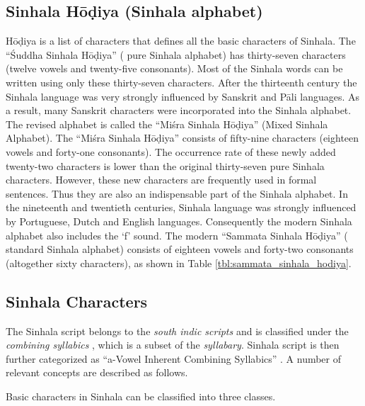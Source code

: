 \documentclass[english]{jnlp_1.3e}
\begin{document}
\subsection{Sinhala H\={o}\d{d}iya (Sinhala alphabet)}

\label{sinhala_alphabet}

H\={o}\d{d}iya is a list of characters  that  defines all the basic characters of Sinhala.
The ``\'{S}uddha Sinhala H\={o}\d{d}iya'' ( pure Sinhala alphabet) has thirty-seven characters (twelve vowels and twenty-five consonants). 
Most of the Sinhala words can be written using only these thirty-seven characters.
After  the  thirteenth century \cite{alphabet}  the  Sinhala language was very strongly influenced by Sanskrit and P\={a}li languages. 
As a result, many Sanskrit characters were incorporated into the Sinhala alphabet.
The revised alphabet is called the ``Mi\'{s}ra Sinhala H\={o}\d{d}iya'' (Mixed Sinhala Alphabet). 
The ``Mi\'{s}ra Sinhala H\={o}\d{d}iya'' consists of fifty-nine characters (eighteen vowels and forty-one consonants). 
The occurrence rate of these newly added twenty-two characters is lower than the original thirty-seven pure Sinhala characters. 
However, these new characters are frequently used in formal sentences. 
Thus they are also an indispensable part of the Sinhala alphabet.
In the nineteenth and twentieth centuries, Sinhala language was strongly influenced by Portuguese, Dutch and English languages. 
Consequently the modern Sinhala alphabet  also includes  the `f' sound. 
The  modern  ``Sammata Sinhala H\={o}\d{d}iya'' ( standard Sinhala alphabet) consists of eighteen vowels and forty-two consonants (altogether sixty characters), as shown in Table \ref{tbl:sammata_sinhala_hodiya}. 


\subsection{Sinhala Characters}

The Sinhala script belongs to the   {\it south indic scripts}   
and  is classified under the  {\it combining syllabics} , which is a subset of the  {\it syllabary}. 
Sinhala script is then further categorized as ``a-Vowel Inherent Combining Syllabics'' \cite{codes}. 
A number of relevant concepts are described as follows.


 Basic characters in Sinhala  can be classified  into three  classes.
\end{document}
